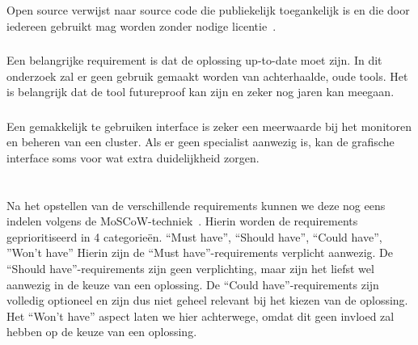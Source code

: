 \subsubsection{}
\label{subsubsec:Open source}
Open source verwijst naar source code die publiekelijk toegankelijk is en die door iedereen gebruikt mag worden zonder nodige licentie~\autocite{2021c}. %

\subsubsection{}
\label{subsubsec:Anno 2020-2021}
Een belangrijke requirement is dat de oplossing up-to-date moet zijn. In dit onderzoek zal er geen gebruik gemaakt worden van achterhaalde, oude tools. Het is belangrijk dat de tool futureproof kan zijn en zeker nog jaren kan meegaan.

\subsubsection{}
\label{subsubsec:Grafische interface}
Een gemakkelijk te gebruiken interface is zeker een meerwaarde bij het monitoren en beheren van een cluster. Als er geen specialist aanwezig is, kan de grafische interface soms voor wat extra duidelijkheid zorgen.


\section{}
\label{sec:Indelen requirements volgens MoSCoW-techniek}

Na het opstellen van de verschillende requirements kunnen we deze nog eens indelen volgens de MoSCoW-techniek~\autocite{Ahmad2017}. Hierin worden de requirements geprioritiseerd in 4 categorieën. “Must have”, “Should have”, “Could have”, ”Won't have” Hierin zijn de “Must have”-requirements verplicht aanwezig. De “Should have”-requirements zijn geen verplichting, maar zijn het liefst wel aanwezig in de keuze van een oplossing. De “Could have”-requirements zijn volledig optioneel en zijn dus niet geheel relevant bij het kiezen van de oplossing. Het “Won't have” aspect laten we hier achterwege, omdat dit geen invloed zal hebben op de keuze van een oplossing.

